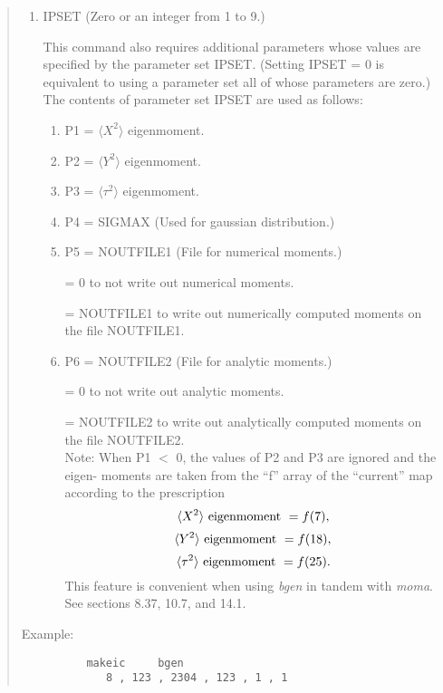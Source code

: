 \begin{quotation}
\begin{enumerate}
\item  IPSET (Zero or an integer from 1 to 9.)

       This command also requires additional parameters whose values are
specified by the parameter set IPSET.  (Setting IPSET = 0 is equivalent to using a parameter set all of whose parameters are zero.)  The contents of parameter set IPSET
are used as follows:

\begin{enumerate}

\item  P1 = $\langle X^2\rangle$ eigenmoment.

\item  P2 = $\langle Y^2\rangle$ eigenmoment.

\item  P3 = $\langle \tau^2\rangle$ eigenmoment.

\item  P4 = SIGMAX (Used for gaussian distribution.)

\item  P5 = NOUTFILE1 (File for numerical moments.)

		  = 0 to not write out numerical moments.

		  = NOUTFILE1 to write out numerically computed moments on the file
		\hspace*{1em}NOUTFILE1.

\item  P6 = NOUTFILE2 (File for analytic moments.)

		  = 0 to not write out analytic moments.

		  = NOUTFILE2 to write out analytically computed moments on the file
		\hspace*{1em}NOUTFILE2. \\

		Note:  When P1 $<$ 0, the values of P2 and P3 are ignored and the eigen-
		moments are taken from the ``f'' array of the ``current'' map according
		to the prescription
		\[
		\langle X^2\rangle \ {\rm eigenmoment} \ = f(7),
		\]
		\[
		\langle Y^2\rangle \ {\rm eigenmoment} \ = f(18),
		\]
		\[
		\langle \tau^2\rangle \ {\rm eigenmoment} \ = f(25).
		\]
		This feature is convenient when using {\em bgen} in tandem with {\em
		moma}.  See sections 8.37, 10.7, and 14.1.

\end{enumerate}
\end{enumerate}

\vspace{5mm}
\noindent Example:
\begin{verbatim}
          makeic     bgen
             8 , 123 , 2304 , 123 , 1 , 1
\end{verbatim}
\end{quotation}

